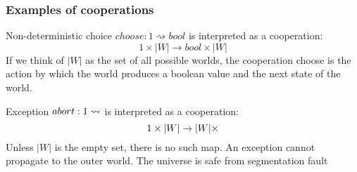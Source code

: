 \documentclass{beamer}
\begin{document}
\begin{frame}
    \frametitle{Examples of cooperations}

    \begin{example}
        Non-deterministic choice $choose : 1 \rightsquigarrow bool$ is interpreted as a cooperation:
        \[
          1 \times |W| \rightarrow bool \times |W|  
        \]
        If we think of $|W |$
as the set of all possible worlds, the cooperation choose is the action by which the world
produces a boolean value and the next state of the world.
    \end{example}

\begin{example}
    Exception $abort : 1 \rightsquigarrow \empty$ is interpreted as a cooperation:
    \[
      1 \times |W| \rightarrow  |W| \times \empty  
    \]
    Unless $|W|$ is the empty set, there is no such map. An exception cannot propagate to the
outer world. The universe is safe from segmentation fault
\end{example}
\end{frame}
\end{document}
